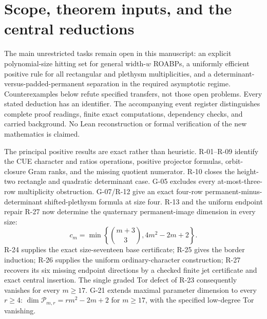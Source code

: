\section{Scope, theorem inputs, and the central reductions}

The main unrestricted tasks remain open in this manuscript: an explicit polynomial-size hitting set for general width-$w$ ROABPs, a uniformly efficient positive rule for all rectangular and plethysm multiplicities, and a determinant-versus-padded-permanent separation in the required asymptotic regime. Counterexamples below refute specified transfers, not those open problems. Every stated deduction has an identifier. The accompanying event register distinguishes complete proof readings, finite exact computations, dependency checks, and carried background. No Lean reconstruction or formal verification of the new mathematics is claimed.

The principal positive results are exact rather than heuristic. R-01--R-09 identify the CUE character and ratios operations, positive projector formulas, orbit-closure Gram ranks, and the missing quotient numerator. R-10 closes the height-two rectangle and quadratic determinant case. G-05 excludes every at-most-three-row multiplicity obstruction. G-07/R-12 give an exact four-row permanent-minus-determinant shifted-plethysm formula at size four. R-13 and the uniform endpoint repair R-27 now determine the quaternary permanent-image dimension in every size:
\[
 c_m=\min\left\{\binom{m+3}{3},4m^2-2m+2\right\}.
\]
R-24 supplies the exact size-seventeen base certificate; R-25 gives the border induction; R-26 supplies the uniform ordinary-character construction; R-27 recovers its six missing endpoint directions by a checked finite jet certificate and exact central insertion. The single graded Tor defect of R-23 consequently vanishes for every $m\ge17$. G-21 extends maximal parameter dimension to every $r\ge4$: $\dim\mathcal P_{m,r}=rm^2-2m+2$ for $m\ge17$, with the specified low-degree Tor vanishing.

